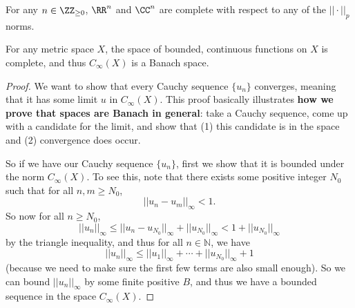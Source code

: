 \begin{example}
For any $n \in \ZZ_{\ge 0}$, $\RR^n$ and $\CC^n$ are complete with respect to any of the $||\cdot||_p$ norms.
\end{example}

\begin{theorem}
For any metric space $X$, the space of bounded, continuous functions on $X$ is complete, and thus $C_{\infty}(X)$ is a Banach space.
\end{theorem}
\begin{proof}
We want to show that every Cauchy sequence $\{u_n\}$ converges, meaning that it has some limit $u$ in $C_{\infty}(X)$. This proof basically illustrates \textbf{how we prove that spaces are Banach in general}: take a Cauchy sequence, come up with a candidate for the limit, and show that (1) this candidate is in the space and (2) convergence does occur.

So if we have our Cauchy sequence $\{u_n\}$, first we show that it is bounded under the norm $C_{\infty}(X)$. To see this, note that there exists some positive integer $N_0$ such that for all $n, m \ge N_0$, 
\[
    ||u_n-u_m||_{\infty} < 1.
\]
So now for all $n \ge N_0$,
\[
    ||u_n||_{\infty} \le ||u_n - u_{N_0}||_{\infty} + ||u_{N_0}||_{\infty} < 1 + ||u_{N_0}||_{\infty}
\]
by the triangle inequality, and thus for all $n \in \mathbb{N}$, we have
\[
    ||u_n||_{\infty} \le ||u_1||_{\infty} + \cdots + ||u_{N_0}||_{\infty} + 1
\]
(because we need to make sure the first few terms are also small enough). So we can bound $||u_n||_{\infty}$ by some finite positive $B$, and thus we have a bounded sequence in the space $C_{\infty}(X)$.


\end{proof}
